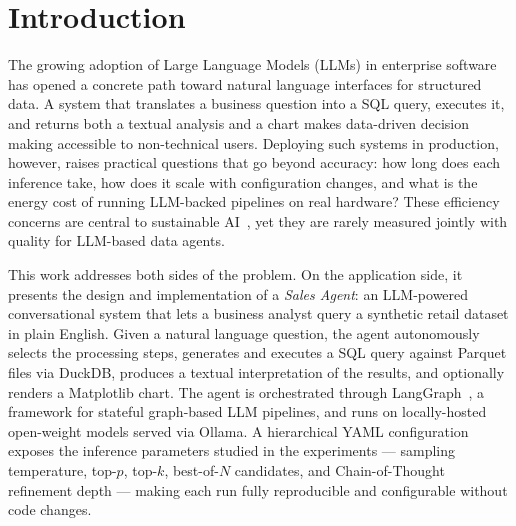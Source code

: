 \documentclass[11pt,a4paper,twocolumn]{article}
\begin{document}



\section{Introduction}
\label{sec:introduction}

The growing adoption of Large Language Models (LLMs) in enterprise software has opened a concrete
path toward natural language interfaces for structured data. A system that translates a business
question into a SQL query, executes it, and returns both a textual analysis and a chart makes
data-driven decision making accessible to non-technical users. Deploying such systems in
production, however, raises practical questions that go beyond accuracy: how long does each
inference take, how does it scale with configuration changes, and what is the energy cost of
running LLM-backed pipelines on real hardware? These efficiency concerns are central to
sustainable AI~\cite{strubell2019energy, schwartz2020greenai}, yet they are rarely measured
jointly with quality for LLM-based data agents.

This work addresses both sides of the problem. On the application side, it presents the design
and implementation of a \textit{Sales Agent}: an LLM-powered conversational system that lets a
business analyst query a synthetic retail dataset in plain English. Given a natural language
question, the agent autonomously selects the processing steps, generates and executes a SQL query
against Parquet files via DuckDB, produces a textual interpretation of the results, and optionally
renders a Matplotlib chart. The agent is orchestrated through LangGraph~\cite{langgraph}, a
framework for stateful graph-based LLM pipelines, and runs on locally-hosted open-weight models
served via Ollama. A hierarchical YAML configuration exposes the inference parameters studied in the experiments ---
sampling temperature, top-$p$, top-$k$, best-of-$N$ candidates, and Chain-of-Thought
refinement depth --- making each run fully reproducible and configurable
without code changes.
\end{document}
